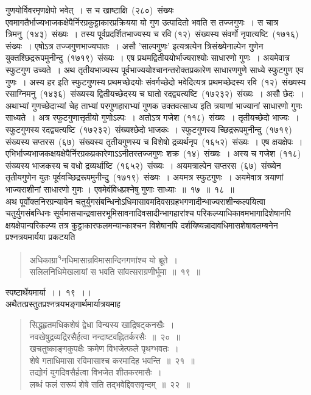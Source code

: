 \documentclass[11pt, openany]{book}
\begin{document}
\newpage
\thispagestyle{fancy}
\fancyhf{}
\noindent
गुणयोर्विवरमृणक्षेपो भवेत्~। स च खाष्टाक्षि~(२८०)~संख्यः~ एवमागतैर्भाज्यभाजकक्षेपैर्निरग्रकुट्टाकारप्रक्रियया यो गुण उत्पादितो भवति स तज्जगुणः~। स चात्र त्रिमनु~(१४३)~संख्यः~। तस्य पूर्वप्रदर्शितभाज्यस्य च रवि (१२)~संख्यस्य संवर्गो नृपात्यष्टि~(१७१६)~ संख्यः~। एषोऽत्र तज्जगुणभाज्यघातः~। असौ 'साल्पगुणः' इत्यत्रत्येन त्रिसंख्येनाल्पेन गुणेन युक्तश्छिद्ररूपमुनीन्दु~(१७१९)~संख्यः~। एष प्रथमद्वितीययोर्भाज्यराश्योः साधारणो गुणः~। अयमेवात्र स्फुटगुण उच्यते~। अथ तृतीयभाज्यस्य पूर्वभाज्ययोश्चानन्तरोक्तप्रकारेण साधारणगुणे साध्ये स्फुटगुण एव गुणः~। अस्य हर इति स्फुटगुणस्य प्रथमच्छेदयोः संवर्गच्छेदो भवेदित्यत्र प्रथमच्छेदस्य रवि~(१२)~संख्यस्य रसाग्निमनु~(१४३६)~संख्यस्य द्वितीयच्छेदस्य च घातो रदद्व्यत्यष्टि~(१७२३२)~संख्यः~। असौ छेदः~। अथाभ्यां गुणच्छेदाभ्यां चेह ताभ्यां परगुणहाराभ्यां गुणक उक्तवत्साध्य इति त्रयाणां भाज्यानां साधारणो गुणः साध्यते~। अत्र स्फुटगुणात्तृतीयो गुणोऽल्पः~। अतोऽत्र गजेश~(११८)~संख्यः~। तृतीयच्छेदो भाज्यः~। स्फुटगुणस्य रदद्व्यत्यष्टि~(१७२३२)~संख्यश्छेदो भाजकः~। स्फुटगुणस्य च्छिद्ररूपमुनीन्दु~(१७१९)~
संख्यस्य सप्तरस~(६७)~संख्यस्य तृतीयगुणस्य च विशेषो द्रव्यर्थनृप~(१६५२)~संख्यः~। एष क्षयक्षेपः~। एभिर्भाज्यभाजकक्षयक्षेपैर्निरग्रकप्रकारेणाऽऽनीतस्तज्जगुणः शक्र~(१४)~संख्यः~। अस्य च गजेश~(११८)~ संख्यस्य भाजकस्य च वधो द्रव्यर्थाष्टि~(१६५२)~संख्यः~। अयमत्राल्पेन सप्तरस~(६७)~संख्येन तृतीयगुणेन युतः पूर्ववच्छिद्ररूपमुनीन्दु~(१७१९)~संख्यः~। अयमत्र स्फुटगुणः~। अयमेवात्र त्रयाणां भाज्यराशीनां साधारणो गुणः । एवमेवंविधप्रश्नेषु गुणाः साध्याः~॥~१७~॥~१८~॥\\
\indent
अथ पूर्वोक्तनिरग्रन्यायेन चतुर्युगसंबन्धिनोऽधिमासावमदिवसग्रहभगणादीन्भाज्यराशीन्कल्पयित्वा चतुर्युगसंबन्धिनः सूर्यमासचान्द्रवासरभूमिसावनादिवसादीन्भागहारांश्च परिकल्प्याधिकावमभागादिशेषानपि क्षयक्षेपान्परिकल्प्य तत्र कुट्टाकारफलमन्यान्काश्चन विशेषानपि दर्शयिष्यन्नादावधिमासशेषावलम्बनेन प्रश्नत्रयमार्यया प्रकटयति\textendash
\begin{quote}
{\ks अधिकाग्रा\textsuperscript{१}नधिमासान्रविमासान्दिनगणांश्च यो ब्रूते~।\\
सलिलनिधिमेखलायां स भवति सांवत्सराग्रणीर्भूमा~॥~१९~॥}
\end{quote}


\newpage
\thispagestyle{fancy}
\fancyhf{}
\indent
स्पष्टार्थेयमार्या~।।~१९~।।\\
\indent
अथैतत्प्रस्तुतप्रश्नत्रयभङ्गार्थमार्यात्रयमाह\textendash
\begin{quote}
{\ks सिद्धहृतमधिकशेषं द्वेधा विन्यस्य खाद्रिषट्कनखैः~।\\
नवखेषुद्रव्यद्रिरसैर्हत्वा नन्दाष्टवह्नितर्करसैः~॥~२०~॥\\
खचतुष्काङ्गकुपक्षैः क्रमेण विभजेत्फले पृथग्भवतः~।\\
शेषे गताधिमासा रविमासाश्च करमादिह भवन्ति~॥~२१~॥\\
तद्योगं युगदिवसैर्हत्वा विभजेत शीतकरमासैः~।\\
लब्धं फलं सरूपं शेषे सति तद्भवेद्दिवसवृन्दम्~॥~२२~॥}
\end{quote}
\end{document}
